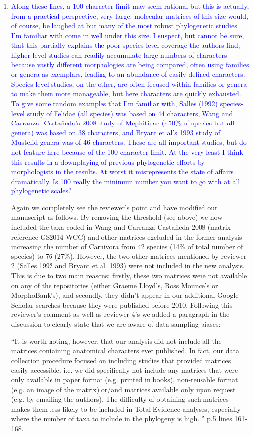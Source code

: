\documentclass[12pt,letterpaper]{article}
\begin{document}
\begin{enumerate}
\item{\textcolor{blue}{Along these lines, a 100 character limit may seem rational but this is actually, from a practical perspective, very large. molecular matrices of this size would, of course, be laughed at but many of the most robust phylogenetic studies I'm familiar with come in well under this size. I suspect, but cannot be sure, that this partially explains the poor species level coverage the authors find; higher level studies can readily accumulate large numbers of characters because vastly different morphologies are being compared, often using families or genera as exemplars, leading to an abundance of easily defined characters. Species level studies, on the other, are often focused within families or genera to make them more manageable, but here characters are quickly exhausted. To give some random examples that I'm familiar with, Salles (1992) species-level study of Felidae (all species) was based on 44 characters, Wang and Carranza- Casta\~{n}eda's 2008 study of Mephitidae (\textasciitilde50\% of species but all genera) was based on 38 characters, and Bryant et al's 1993 study of Mustelid genera was of 46 characters. These are all important studies, but do not feature here because of the 100 character limit. At the very least I think this results in a downplaying of previous phylogenetic efforts by morphologists in the results. At worst it misrepresents the state of affairs dramatically. Is 100 really the minimum number you want to go with at all phylogenetic scales?}}

Again we completely see the reviewer's point and have modified our manuscript as follows.
By removing the threshold (see above) we now included the taxa coded in Wang and Carranza-Casta\~{n}eda 2008 (matrix reference GS2014-WCC) and other matrices excluded in the former analysis increasing the number of Carnivora from 42 species (14\% of total number of species) to 76 (27\%).
However, the two other matrices mentioned by reviewer 2 (Salles 1992 and Bryant et al. 1993) were not included in the new analysis.
This is due to two main reasons: firstly, these two matrices were not available on any of the repositories (either Graeme Lloyd's, Ross Mounce's or MorphoBank's), and secondly, they didn't appear in our additional Google Scholar searches because they were published before 2010.
Following this reviewer's comment as well as reviewer 4's we added a paragraph in the discussion to clearly state that we are aware of data sampling biases:

``It is worth noting, however, that our analysis did not include all the matrices containing anatomical characters ever published.
In fact, our data collection procedure focused on including studies that provided matrices easily accessible, i.e. we did specifically not include any matrices that were only available in paper format (e.g. printed in books), non-reusable format (e.g. an image of the matrix)  or/and matrices available only upon request (e.g. by emailing the authors).
The difficulty of obtaining such matrices makes them less likely to be included in Total Evidence analyses, especially where the number of taxa to include in the phylogeny is high.
'' p.5 lines 161-168.



\end{enumerate}
\end{document}
